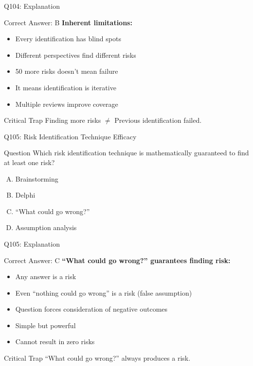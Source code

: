 \documentclass{beamer}
\begin{document}
	\begin{frame}{Q104: Explanation}
		\begin{block}{Correct Answer: B}
			\textbf{Inherent limitations:}
			\begin{itemize}
				\item Every identification has blind spots
				\item Different perspectives find different risks
				\item 50 more risks doesn't mean failure
				\item It means identification is iterative
				\item Multiple reviews improve coverage
			\end{itemize}
		\end{block}
		\begin{alertblock}{Critical Trap}
			Finding more risks $\neq$ Previous identification failed.
		\end{alertblock}
	\end{frame}
	
	\begin{frame}{Q105: Risk Identification Technique Efficacy}
		\begin{block}{Question}
			Which risk identification technique is mathematically guaranteed to find at least one risk?
		\end{block}
		\begin{enumerate}[(A)]
			\item Brainstorming
			\item Delphi
			\item ``What could go wrong?''
			\item Assumption analysis
		\end{enumerate}
	\end{frame}
	
	\begin{frame}{Q105: Explanation}
		\begin{block}{Correct Answer: C}
			\textbf{``What could go wrong?'' guarantees finding risk:}
			\begin{itemize}
				\item Any answer is a risk
				\item Even ``nothing could go wrong'' is a risk (false assumption)
				\item Question forces consideration of negative outcomes
				\item Simple but powerful
				\item Cannot result in zero risks
			\end{itemize}
		\end{block}
		\begin{alertblock}{Critical Trap}
			``What could go wrong?'' always produces a risk.
		\end{alertblock}
	\end{frame}
	
\end{document}

